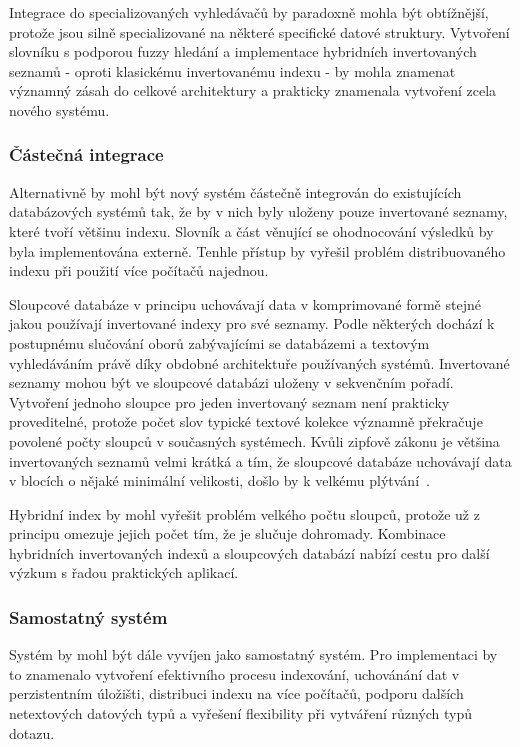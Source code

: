\documentclass[11pt,letterpaper,oneside,openright]{book}
\begin{document}
Integrace do specializovaných vyhledávačů by paradoxně mohla být obtížnější,
protože jsou silně specializované na některé specifické datové struktury.
Vytvoření slovníku s podporou fuzzy hledání a implementace hybridních
invertovaných seznamů - oproti klasickému invertovanému indexu - by mohla
znamenat významný zásah do celkové architektury a prakticky znamenala vytvoření
zcela nového systému.

\subsubsection{Částečná integrace}
Alternativně by mohl být nový systém částečně integrován do existujících
databázových systémů tak, že by v nich byly uloženy pouze invertované seznamy,
které tvoří většinu indexu. Slovník a část věnující se ohodnocování výsledků by
byla implementována externě. Tenhle přístup by vyřešil problém distribuovaného
indexu při použití více počítačů najednou.

Sloupcové databáze v principu uchovávají data v komprimované formě stejné jakou
používají invertované indexy pro své seznamy. Podle některých dochází k
postupnému slučování oborů zabývajícími se databázemi a textovým vyhledáváním
právě díky obdobné architektuře používaných systémů. Invertované seznamy mohou
být ve sloupcové databázi uloženy v sekvenčním pořadí. Vytvoření jednoho
sloupce pro jeden invertovaný seznam není prakticky proveditelné, protože počet
slov typické textové kolekce významně překračuje povolené počty sloupců v
současných systémech. Kvůli zipfově zákonu je většina invertovaných seznamů
velmi krátká a tím, že sloupcové databáze uchovávají data v blocích o nějaké
minimální velikosti, došlo by k velkému plýtvání~\cite{Bjorklund_aconfluence}.

Hybridní index by mohl vyřešit problém velkého počtu sloupců, protože už z
principu omezuje jejich počet tím, že je slučuje dohromady. Kombinace
hybridních invertovaných indexů a sloupcových databází nabízí cestu pro další
výzkum s řadou praktických aplikací.

\subsubsection{Samostatný systém}
Systém by mohl být dále vyvíjen jako samostatný systém. Pro implementaci by to
znamenalo vytvoření efektivního procesu indexování, uchovánání dat v
perzistentním úložišti, distribuci indexu na více počítačů, podporu dalších
netextových datových typů a vyřešení flexibility při vytváření různých typů
dotazu.
\end{document}

